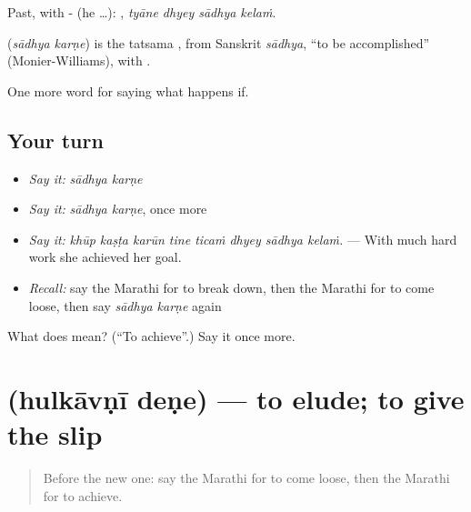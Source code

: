Past, with - (he …):    , \emph{tyāne dhyey sādhya kelaṁ}.

\begin{cousinweb}
\textbf{ } (\emph{sādhya karṇe}) is the tatsama , from Sanskrit \emph{sādhya}, \textquotedblleft{}to be accomplished\textquotedblright{} (Monier-Williams), with .
\end{cousinweb}

\begin{grammarlens}[title={What you've built}]
One more word for saying what happens if.
\end{grammarlens}

\subsection*{Your turn}
\begin{itemize}
\raggedright
  \item \emph{Say it:} \emph{sādhya karṇe}
  \item \emph{Say it:} \emph{sādhya karṇe}, once more
  \item \emph{Say it:} \emph{khūp kaṣṭa karūn tine ticaṁ dhyey sādhya kelaṁ.} — With much hard work she achieved her goal.
  \item \emph{Recall:} say the Marathi for to break down, then the Marathi for to come loose, then say \emph{sādhya karṇe} again
\end{itemize}

\begin{tcolorbox}[breakable,colback=teal!4,colframe=teal!35!black,title={Before you move on}]
What does   mean? (\textquotedblleft{}To achieve\textquotedblright{}.) Say it once more.
\end{tcolorbox}
\section[\texorpdfstring{\mr{हुलकावणी} \mr{देणे} (hulkāvṇī deṇe)}{हुलकावणी देणे (hulkāvṇī deṇe)}]{  (hulkāvṇī deṇe) — to elude; to give the slip}

\label{lesson:MR-C553-hulkavni-dene}



\begin{quote}
Before the new one: say the Marathi for to come loose, then the Marathi for to achieve.
\end{quote}

